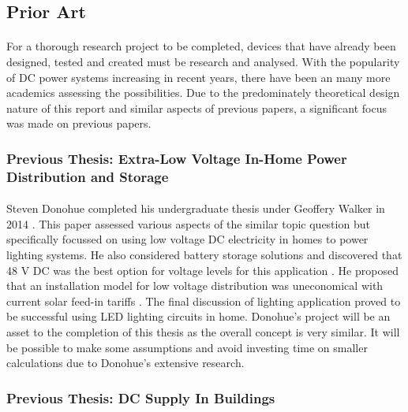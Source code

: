 
\subsection{Prior Art}

\paragraph{}
For a thorough research project to be completed, devices that have already been designed, tested and created must be research and analysed. With the popularity of DC power systems increasing in recent years, there have been an many more academics assessing the possibilities. Due to the predominately theoretical design nature of this report and similar aspects of previous papers, a significant focus was made on previous papers.  

\subsubsection{Previous Thesis: Extra-Low Voltage In-Home Power Distribution and Storage}

\paragraph{}
Steven Donohue completed his undergraduate thesis under Geoffery Walker in 2014 \cite{Donohue2014}. This paper assessed various aspects of the similar topic question but specifically focussed on using low voltage DC electricity in homes to power lighting systems. He also considered battery storage solutions and discovered that 48 V DC was the best option for voltage levels for this application \cite{Donohue2014}. He proposed that an installation model for low voltage distribution was uneconomical with current solar feed-in tariffs \cite{Donohue2014}. The final discussion of lighting application proved to be successful using LED lighting circuits in home. Donohue's project will be an asset to the completion of this thesis as the overall concept is very similar. It will be possible to make some assumptions and avoid investing time on smaller calculations due to Donohue's extensive research.         

\subsubsection{Previous Thesis: DC Supply In Buildings}

